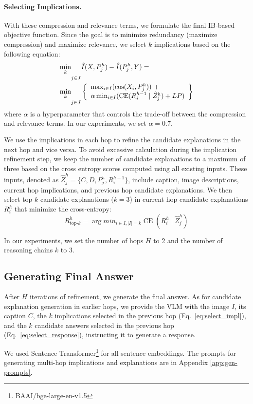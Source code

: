 \paragraph{Selecting Implications.} With these compression and relevance terms, we formulate the final IB-based objective function. Since the goal is to minimize redundancy (maximize compression) and maximize relevance, we select $k$ implications based on the following equation:
\begin{align}
\label{eq:select_impl}
& {\min\limits_{\underset{}{k}}}_{j \in J} \hat{I}(X, P_{j}^{h}) - \hat{I}(P_{j}^{h}, Y) = \\  
& {\min\limits_{\underset{}{k}}}_{j \in J} \left\{
\begin{array}{l}
    \max_{i\in I}(\operatorname{cos}(X_{i}, P_{j}^{h}))~+ \\
    \alpha \min_{i \in I} (\operatorname{CE}(R_i^{h-1} \mid \hat{Z}_j^{h}) + LP)
\end{array}
\right\} \notag
\end{align}
\noindent where $\alpha$ is a hyperparameter that controls the trade-off between the compression and relevance terms. In our experiments, we set $\alpha = 0.7$.

We use the implications in each hop to refine the candidate explanations in the next hop and vice versa. To avoid excessive calculation during the implication refinement step, we keep the number of candidate explanations to a maximum of three based on the cross entropy scores computed using all existing inputs. These inputs, denoted as $\hat{Z}_j^{h} = \{C, D, P_j^{h}, R_i^{h-1}\}$, include caption, image descriptions, current hop implications, and previous hop candidate explanations. We then select top-$k$ candidate explanations ($k=3$) in current hop candidate explanations $R_i^{h}$ that minimize the cross-entropy: 
\begin{equation}
R_{\text{top-}k}^{h} = \arg min_{i \in I, |I| = k} \operatorname{CE}(R_i^{h} \mid \hat{Z}_j^{h})
\label{eq:select_response}
\end{equation}

\noindent In our experiments, we set the number of hops $H$ to 2 and the number of reasoning chains $k$ to 3. %

\subsection{Generating Final Answer}
\label{sec:method:gen_response}

After $H$ iterations of refinement, we generate the final answer. As for candidate explanation generation in earlier hops, we provide the VLM with the image $I$, its caption $C$, the $k$ implications selected in the previous hop (Eq.~\ref{eq:select_impl}), and the $k$ candidate answers selected in the previous hop (Eq.~\ref{eq:select_response}), instructing it to generate a response.

We used Sentence Transformer\footnote{BAAI/bge-large-en-v1.5} for all sentence embeddings. The prompts for generating multi-hop implications and explanations are in Appendix \ref{app:gen-prompts}.